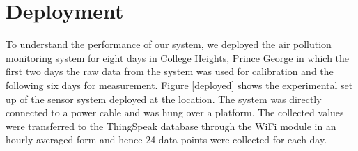 \section{Deployment}

To understand the performance of our system, we deployed the air pollution monitoring system for eight days in College Heights, Prince George in which the first two days the raw data from the system was used for calibration and the following six days for measurement. Figure \ref{deployed} shows the experimental set up of the sensor system deployed at the location. The system was directly connected to a power cable and was hung over a platform. The collected values were transferred to the ThingSpeak database through the WiFi module in an hourly averaged form and hence 24 data points were collected for each day.

